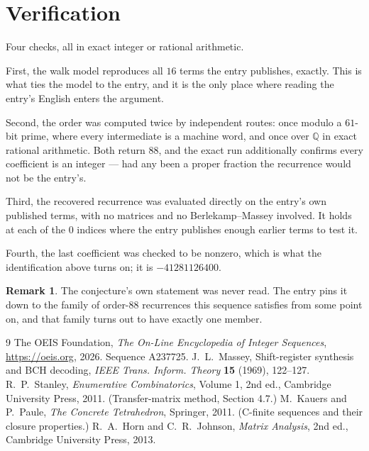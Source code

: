 \documentclass[11pt,a4paper]{article}
\theoremstyle{plain}
\theoremstyle{definition}
\newtheorem{remark}[theorem]{Remark}
\begin{document}
\section{Verification}

Four checks, all in exact integer or rational arithmetic.

First, the walk model reproduces all $16$ terms the entry publishes, exactly. This is
what ties the model to the entry, and it is the only place where reading the entry's English
enters the argument.

Second, the order was computed twice by independent routes: once modulo a $61$-bit prime, where
every intermediate is a machine word, and once over $\mathbb{Q}$ in exact rational arithmetic.
Both return $88$, and the exact run additionally confirms every coefficient is an integer
--- had any been a proper fraction the recurrence would not be the entry's.

Third, the recovered recurrence was evaluated directly on the entry's own published terms, with
no matrices and no Berlekamp--Massey involved. It holds at each of the $0$ indices where
the entry publishes enough earlier terms to test it.

Fourth, the last coefficient was checked to be nonzero, which is what the identification above
turns on; it is $-41281126400$.

\begin{remark}
The conjecture's own statement was never read. The entry pins it down to the family of
order-$88$ recurrences this sequence satisfies from some point on, and that family turns
out to have exactly one member.
\end{remark}

\begin{thebibliography}{9}
 The OEIS Foundation, \emph{The On-Line Encyclopedia of Integer
Sequences}, \url{https://oeis.org}, 2026. Sequence A237725.
 J.~L.~Massey, Shift-register synthesis and BCH decoding, \emph{IEEE
Trans. Inform. Theory} \textbf{15} (1969), 122--127.
 R.~P.~Stanley, \emph{Enumerative Combinatorics}, Volume 1, 2nd ed.,
Cambridge University Press, 2011. (Transfer-matrix method, Section 4.7.)
 M.~Kauers and P.~Paule, \emph{The Concrete Tetrahedron}, Springer, 2011.
(C-finite sequences and their closure properties.)
 R.~A.~Horn and C.~R.~Johnson, \emph{Matrix Analysis}, 2nd ed., Cambridge
University Press, 2013.
\end{thebibliography}
\end{document}
